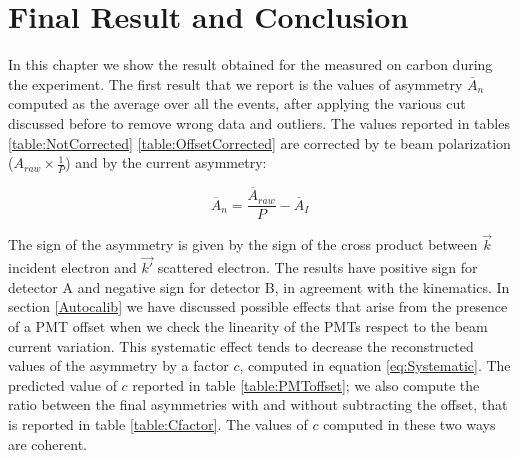 \chapter{Final Result and Conclusion} \label{result}

In this chapter we show the result obtained for the \transv measured on carbon during the experiment.
The first result that we report is the values of asymmetry $\overline{A}_{n}$ computed as the average over all the events, after applying the various cut discussed before to remove wrong data and outliers. The values reported in tables \ref{table:NotCorrected} \ref{table:OffsetCorrected} are corrected by te beam polarization ($A_{raw} \times \frac{1}{P}$) and by the current asymmetry:

\begin{equation}
\overline{A}_{n} = \frac{\overline{A}_{raw}}{P} - \overline{A}_{I}
\end{equation}

The sign of the asymmetry is given by the sign of the cross product between $\vec{k}$ incident electron and $\vec{k'}$ scattered electron. The results have positive sign for detector A and negative sign for detector B, in agreement with the kinematics.
In section \ref{Autocalib} we have discussed possible effects that arise from the presence of a PMT offset when we check the linearity of the PMTs respect to the beam current variation. This systematic effect tends to decrease the reconstructed values of the asymmetry by a factor $c$, computed in equation \ref{eq:Systematic}. The predicted value of $c$ reported in table \ref{table:PMToffset}; we also compute the ratio between the final asymmetries with and without subtracting the offset, that is reported in table \ref{table:Cfactor}. The values of $c$ computed in these two ways are coherent.

